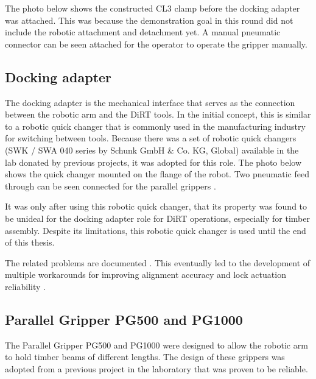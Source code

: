 The photo below shows the constructed CL3 clamp before the docking adapter was attached. This was because the demonstration goal in this round did not include the robotic attachment and detachment yet. A manual pneumatic connector can be seen attached for the operator to operate the gripper manually.

\subsection{Docking adapter}
\label{subsection:exploration-2-docking-adapter}

The docking adapter is the mechanical interface that serves as the connection between the robotic arm and the DiRT tools. In the initial concept, this is similar to a robotic quick changer that is commonly used in the manufacturing industry for switching between tools. Because there was a set of robotic quick changers (SWK / SWA 040 series by Schunk GmbH \& Co. KG, Global) available in the lab donated by previous projects, it was adopted for this role. The photo below shows the quick changer mounted on the flange of the robot. Two pneumatic feed through can be seen connected for the parallel grippers .

It was only after using this robotic quick changer, that its property was found to be unideal for the docking adapter role for DiRT operations, especially for timber assembly. Despite its limitations, this robotic quick changer is used until the end of this thesis.

The related problems are documented . This eventually led to the development of multiple workarounds for improving alignment accuracy  and lock actuation reliability .

\subsection{Parallel Gripper PG500 and PG1000}
\label{subsection:exploration-2-parallel-gripper-pg500-and-pg1000}

The Parallel Gripper PG500 and PG1000 were designed to allow the robotic arm to hold timber beams of different lengths. The design of these grippers was adopted from a previous project in the laboratory that was proven to be reliable. 

